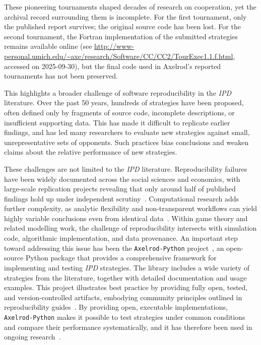\documentclass{article}
\newcommand{\IPD}{\emph{IPD}}
\newcommand{\AXL}{\texttt{Axelrod-Python}}
\begin{document}
These pioneering tournaments shaped decades of research on cooperation, yet the
archival record surrounding them is incomplete. For the first tournament, only
the published report survives; the original source code has been lost. For the
second tournament, the Fortran implementation of the submitted strategies
remains available online (see
\url{http://www-personal.umich.edu/~axe/research/Software/CC/CC2/TourExec1.1.f.html},
accessed on 2025-09-30),
but the final code used in Axelrod's reported tournaments has not been preserved.

This highlights a broader challenge of software reproducibility in
the \IPD{} literature. Over the past 50 years, hundreds of strategies have been
proposed, often defined only by fragments of source code, incomplete
descriptions, or insufficient supporting data. This has made it difficult to
replicate earlier findings, and has led many researchers to evaluate new
strategies against small, unrepresentative sets of opponents. Such practices
bias conclusions and weaken claims about the relative performance of new
strategies.

These challenges are not limited to the \IPD{} literature.
Reproducibility failures have been widely documented across the social sciences
and economics, with large-scale replication projects revealing that only around
half of published findings hold up under independent
scrutiny~\cite{open_science_collaboration2015, camerer2016, camerer2018}. Computational
research adds further complexity, as analytic flexibility and non-transparent
workflows can yield highly variable conclusions even from identical 
data~\cite{silberzahn2018, breznau2022}. Within game theory and related modelling work,
the challenge of reproducibility intersects with simulation code, algorithmic
implementation, and data provenance. 
An important step toward addressing this issue has been the
\texttt{Axelrod-Python} project~\cite{AxelrodProject}, an open-source Python
package that provides a comprehensive framework for implementing and testing
\IPD{} strategies. The library includes a wide variety of strategies from the
literature, together with detailed documentation and usage examples. 
This project illustrates best practice by providing fully open, tested, and version-controlled
artifacts, embodying community principles outlined in reproducibility 
guides~\cite{wilson2014, sandve2013, wilson2017, stodden2018, turingway2022}.
By
providing open, executable implementations, \AXL{} makes it possible to test
strategies under common conditions and compare their performance systematically,
and it has therefore been used in ongoing research~\cite{Harper2017,
Knight2017, glynatsi2024properties, bucciarelli2024studying, macmillan2024game}.
\end{document}
